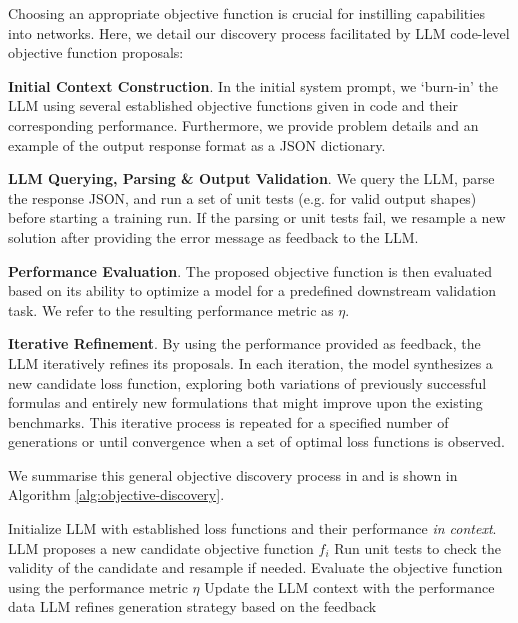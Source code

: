 \documentclass{article}
\theoremstyle{plain}
\theoremstyle{definition}
\theoremstyle{remark}
\begin{document}
Choosing an appropriate objective function is crucial for instilling capabilities into networks. Here, we detail our discovery process facilitated by LLM code-level objective function proposals:

\textbf{Initial Context Construction}. In the initial system prompt, we `burn-in' the LLM using several established objective functions given in code and their corresponding performance. Furthermore, we provide problem details and an example of the output response format as a JSON dictionary.

\textbf{LLM Querying, Parsing \& Output Validation}. We query the LLM, parse the response JSON, and run a set of unit tests (e.g. for valid output shapes) before starting a training run. If the parsing or unit tests fail, we resample a new solution after providing the error message as feedback to the LLM. 

\textbf{Performance Evaluation}. The proposed objective function is then evaluated based on its ability to optimize a model for a predefined downstream validation task. We refer to the resulting performance metric as $\eta$.

\textbf{Iterative Refinement}. By using the performance provided as feedback, the LLM iteratively refines its proposals. In each iteration, the model synthesizes a new candidate loss function, exploring both variations of previously successful formulas and entirely new formulations that might improve upon the existing benchmarks. This iterative process is repeated for a specified number of generations or until convergence when a set of optimal loss functions is observed. 

We summarise this general objective discovery process in  and is shown in Algorithm \ref{alg:objective-discovery}.

\begin{algorithm}
\caption{LLM-Driven Objective Discovery}
\label{alg:objective-discovery}
\begin{algorithmic}[1]
\State Initialize LLM with established loss functions and their performance \textit{in context}.
    \State LLM proposes a new candidate objective function $f_i$
    \State Run unit tests to check the validity of the candidate and resample if needed.
    \State Evaluate the objective function using the performance metric $\eta$
    \State Update the LLM context with the performance data
    \State LLM refines generation strategy based on the feedback
\end{algorithmic}
\end{algorithm}
\end{document}
